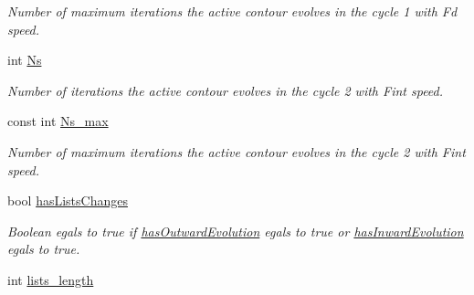 \begin{DoxyCompactItemize}
\begin{DoxyCompactList}\small\item\em Number of maximum iterations the active contour evolves in the cycle 1 with {\itshape Fd} speed. \end{DoxyCompactList}\item 
\hypertarget{classofeli_1_1_active_contour_a38cc27ae9706801882322f02b5db2df8}{int \hyperlink{classofeli_1_1_active_contour_a38cc27ae9706801882322f02b5db2df8}{Ns}}\label{classofeli_1_1_active_contour_a38cc27ae9706801882322f02b5db2df8}

\begin{DoxyCompactList}\small\item\em Number of iterations the active contour evolves in the cycle 2 with {\itshape Fint} speed. \end{DoxyCompactList}\item 
\hypertarget{classofeli_1_1_active_contour_a908322f93a50ce7808960236478649fe}{const int \hyperlink{classofeli_1_1_active_contour_a908322f93a50ce7808960236478649fe}{Ns\-\_\-max}}\label{classofeli_1_1_active_contour_a908322f93a50ce7808960236478649fe}

\begin{DoxyCompactList}\small\item\em Number of maximum iterations the active contour evolves in the cycle 2 with {\itshape Fint} speed. \end{DoxyCompactList}\item 
\hypertarget{classofeli_1_1_active_contour_acaaac3e08e34cf03c1320c220b188b78}{bool \hyperlink{classofeli_1_1_active_contour_acaaac3e08e34cf03c1320c220b188b78}{has\-Lists\-Changes}}\label{classofeli_1_1_active_contour_acaaac3e08e34cf03c1320c220b188b78}

\begin{DoxyCompactList}\small\item\em Boolean egals to true if \hyperlink{classofeli_1_1_active_contour_a9dcea2f4d6803007fe98e38152adf000}{has\-Outward\-Evolution} egals to {\ttfamily true} or \hyperlink{classofeli_1_1_active_contour_af437460aa2cdf312166a3fe4d54beeb4}{has\-Inward\-Evolution} egals to {\ttfamily true}. \end{DoxyCompactList}\item 
\hypertarget{classofeli_1_1_active_contour_aefe0738d8a43f3981d591a0cc78ed717}{int \hyperlink{classofeli_1_1_active_contour_aefe0738d8a43f3981d591a0cc78ed717}{lists\-\_\-length}}\label{classofeli_1_1_active_contour_aefe0738d8a43f3981d591a0cc78ed717}


\end{DoxyCompactItemize}
